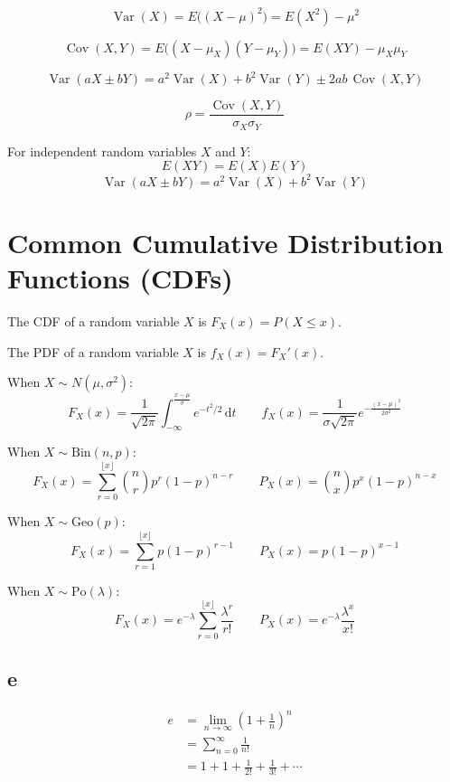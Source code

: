 \documentclass[12pt]{article}
\begin{document}
	\[
	\operatorname{Var}(X)=E\bigl((X-\mu)^2\bigr)=E(X^2)-\mu^2
	\]

	\[
	\operatorname{Cov}(X,Y)=E\bigl((X-\mu_X)(Y-\mu_Y)\bigr)=E(XY)-\mu_X\mu_Y
	\]

	\[
	\operatorname{Var}(aX\pm bY)=a^2\operatorname{Var}(X)+b^2\operatorname{Var}(Y)\pm 2ab\,\operatorname{Cov}(X,Y)
	\]

	\[
	\rho=\frac{\operatorname{Cov}(X,Y)}{\sigma_X\sigma_Y}
	\]

	For independent random variables $X$ and $Y$:
	\[
	E(XY)=E(X)E(Y)
	\]
	\[
	\operatorname{Var}(aX\pm bY)=a^2\operatorname{Var}(X)+b^2\operatorname{Var}(Y)
	\]

	\newpage

	\section*{Common Cumulative Distribution Functions (CDFs)}

	The CDF of a random variable \(X\) is \(F_X(x)=P(X\le x)\).

	The PDF of a random variable \(X\) is \(f_X(x)=F_X'(x)\).

	When $X\sim N(\mu,\sigma^2):$
	\[
	F_X(x)=\frac{1}{\sqrt{2\pi}}\int_{-\infty}^{\frac{x-\mu}{\sigma}} e^{-t^2/2}\,\mathrm{d}t
	\qquad
	f_X(x)=\frac{1}{\sigma\sqrt{2\pi}}e^{-\frac{(x-\mu)^2}{2\sigma^2}}
	\]

	When $X\sim \mathrm{Bin}(n,p):$
	\[
	F_X(x)=\sum_{r=0}^{\lfloor x\rfloor}\binom{n}{r}p^r(1-p)^{n-r}
	\qquad
	P_X(x)=\binom{n}{x}p^x(1-p)^{n-x}
	\]

	When $X\sim \mathrm{Geo}(p):$
	\[
	F_X(x)=\sum_{r=1}^{\lfloor x\rfloor}p(1-p)^{r-1}
	\qquad
	P_X(x)=p(1-p)^{x-1}
	\]

	When $X\sim \mathrm{Po}(\lambda):$
	\[
	F_X(x)=e^{-\lambda}\sum_{r=0}^{\lfloor x\rfloor}\frac{\lambda^r}{r!}
	\qquad
	P_X(x)=e^{-\lambda}\frac{\lambda^x}{x!}
	\]

	\newpage
	
	\subsection*{e}
	\[
	\begin{aligned}
	e&=\lim_{n\to\infty}\left(1+\frac{1}{n}\right)^n\\
	&=\sum_{n=0}^{\infty}\frac{1}{n!}\\
	&=1+1+\frac{1}{2!}+\frac{1}{3!}+\cdots
	\end{aligned}
	\]
\end{document}
